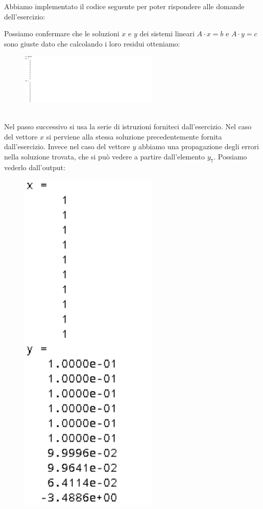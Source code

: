 \begin{flushleft}
Abbiamo implementato il codice seguente per poter rispondere alle domande dell'esercizio:

Possiamo confermare che le soluzioni $x$ e $y$ dei sistemi lineari $A\cdot x = b$ e $A\cdot y = c$ sono giuste dato che calcolando i loro residui otteniamo:
\begin{figure}[h]
\includegraphics[left, width=250px]{cap_3/es16/es316}
\end{figure}
\newline \\
Nel passo successivo si usa la serie di istruzioni forniteci dall'esercizio. Nel caso del vettore $x$ si perviene alla stessa soluzione precedentemente fornita dall'esercizio. Invece nel caso del vettore $y$ abbiamo una propagazione degli errori nella soluzione trovata, che si può vedere a partire dall'elemento $y_7$. Possiamo vederlo dall'output:
\begin{figure}[h]
\includegraphics[left, width=250px]{cap_3/es16/es316a}

\end{figure}
\end{flushleft}
